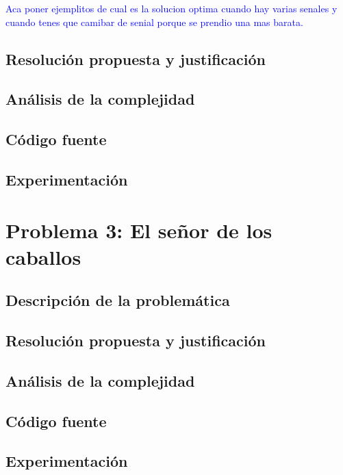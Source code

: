 \documentclass[a4paper]{article}
\begin{document}
\textcolor{blue}{Aca poner ejemplitos de cual es la solucion optima cuando hay varias senales y cuando tenes que camibar de senial porque se prendio una mas barata.}

\subsection{Resoluci\'on propuesta y justificaci\'on}
\subsection{An\'alisis de la complejidad}
\subsection{C\'odigo fuente}
\subsection{Experimentaci\'on}



\newpage

\section{Problema 3: El se\~nor de los caballos}
\subsection{Descripci\'on de la problem\'atica}
\subsection{Resoluci\'on propuesta y justificaci\'on}
\subsection{An\'alisis de la complejidad}
\subsection{C\'odigo fuente}
\subsection{Experimentaci\'on}


\end{document}
